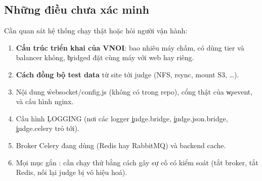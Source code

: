 


\subsection{Những điều chưa xác minh}\label{sec:unverified}
Cần quan sát hệ thống chạy thật hoặc hỏi người vận hành:
\begin{enumerate}
\item \textbf{Cấu trúc triển khai của VNOI}: bao nhiêu máy chấm, có dùng tier và balancer không, \c{bridged} đặt cùng máy với web hay riêng. \tQ
\item \textbf{Cách đồng bộ test data} từ site tới judge (NFS, rsync, mount S3, \ldots). \tQ
\item Nội dung \f{websocket/config.js} (không có trong repo), cổng thật của \c{wsevent}, và cấu hình nginx. \tQ
\item Cấu hình \c{LOGGING} (nơi các logger \c{judge.bridge}, \c{judge.json.bridge}, \c{judge.celery} trỏ tới). \tQ
\item Broker Celery đang dùng (Redis hay RabbitMQ) và backend cache. \tQ
\item Mọi mục gắn \tI: cần chạy thử bằng cách gây sự cố có kiểm soát (tắt broker, tắt Redis, nối lại judge bị vô hiệu hoá).
\end{enumerate}
